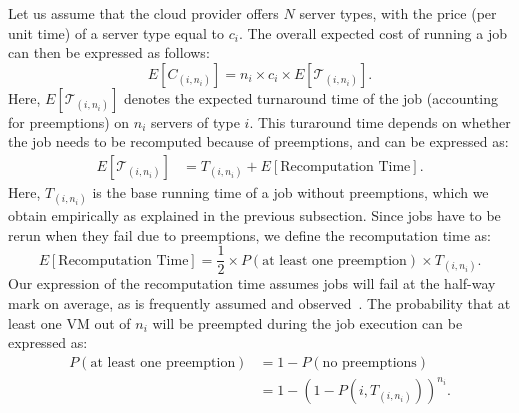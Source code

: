 Let us assume that the cloud provider offers $N$ server types, with the price (per unit time) of a server type equal to $c_i$. 
The overall expected cost of running a job can then be expressed as follows:
\begin{equation}
  \label{eq:e-cost}
  E[C_{( i,n_i )}] = n_i\times c_i \times E[\mathcal{T}_{( i,n_i )}].
\end{equation}
Here, $E[\mathcal{T}_{( i,n_i )}]$ denotes the expected turnaround time of the job (accounting for preemptions) on $n_i$ servers of type $i$.
%
This turaround time depends on whether the job needs to be recomputed because of preemptions, and can be expressed as:
\begin{align}
  \label{eq:turnaround}
  E[\mathcal{T}_{( i,n_i )}] &= T_{( i,n_i )} + E[\text{Recomputation Time}].
\end{align}
Here, $T_{( i,n_i )}$ is the base running time of a job without preemptions, which we obtain empirically as explained in the previous subsection.
Since jobs have to be rerun when they fail due to preemptions, we define the recomputation time as:
\begin{equation}
  \label{eq:recomput}
   E[\text{Recomputation Time}] = \frac{1}{2} \times P(\text{at least one preemption}) \times T_{( i,n_i )}.   
 \end{equation}
Our expression of the recomputation time assumes jobs will fail at the half-way mark on average, as is frequently assumed and observed~\cite{daly2006higher, bougeret_checkpointing_2011}. 
%
The probability that at least one VM out of $n_i$ will be preempted during the job execution can be expressed as:
\begin{align}
  \label{eq:pfail1}
  P(\text{at least one preemption}) &= 1-P(\text{no preemptions}) \\
                                 &= 1-\left(1-P\left(i,T_{(i, n_i)}\right)\right)^{n_i}.
\end{align}

